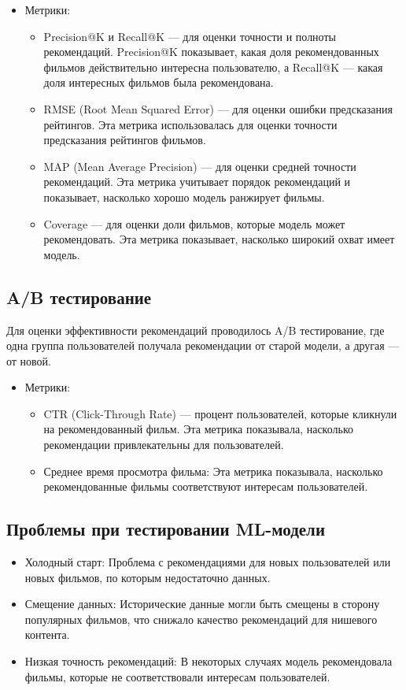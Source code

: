 \begin{itemize}
    \item Метрики:
    \begin{itemize}
        \item Precision@K и Recall@K — для оценки точности и полноты рекомендаций. Precision@K показывает, какая доля рекомендованных фильмов действительно интересна пользователю, а Recall@K — какая доля интересных фильмов была рекомендована.
        \item RMSE (Root Mean Squared Error) — для оценки ошибки предсказания рейтингов. Эта метрика использовалась для оценки точности предсказания рейтингов фильмов.
        \item MAP (Mean Average Precision) — для оценки средней точности рекомендаций. Эта метрика учитывает порядок рекомендаций и показывает, насколько хорошо модель ранжирует фильмы.
        \item Coverage — для оценки доли фильмов, которые модель может рекомендовать. Эта метрика показывает, насколько широкий охват имеет модель.
    \end{itemize}
\end{itemize}

\subsection*{A/B тестирование}
Для оценки эффективности рекомендаций проводилось A/B тестирование, где одна группа пользователей получала рекомендации от старой модели, а другая — от новой.

\begin{itemize}
    \item Метрики:
    \begin{itemize}
        \item CTR (Click-Through Rate) — процент пользователей, которые кликнули на рекомендованный фильм. Эта метрика показывала, насколько рекомендации привлекательны для пользователей.
        \item Среднее время просмотра фильма: Эта метрика показывала, насколько рекомендованные фильмы соответствуют интересам пользователей.
    \end{itemize}
\end{itemize}

\subsection*{Проблемы при тестировании ML-модели}
\begin{itemize}
    \item Холодный старт: Проблема с рекомендациями для новых пользователей или новых фильмов, по которым недостаточно данных.
    \item Смещение данных: Исторические данные могли быть смещены в сторону популярных фильмов, что снижало качество рекомендаций для нишевого контента.
    \item Низкая точность рекомендаций: В некоторых случаях модель рекомендовала фильмы, которые не соответствовали интересам пользователей.
\end{itemize}

